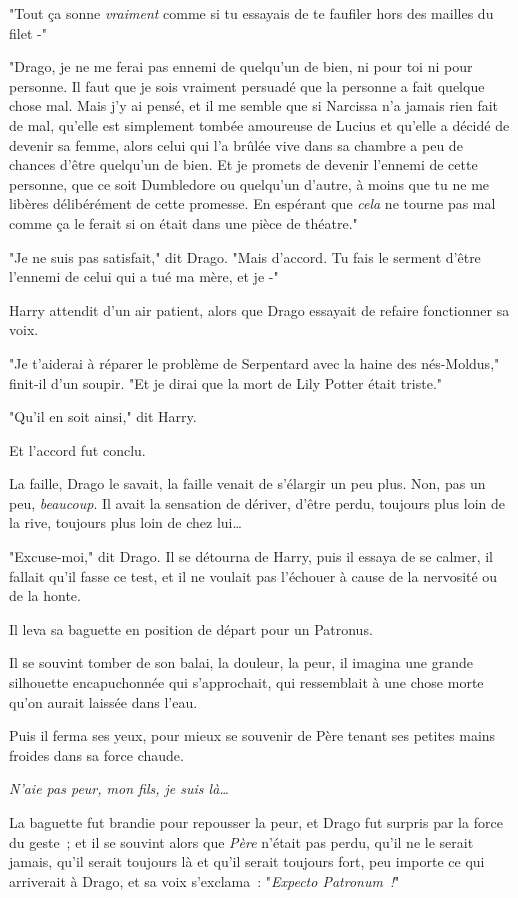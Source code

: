 "Tout ça sonne \emph{vraiment} comme si tu essayais de te faufiler hors des mailles du filet -"

"Drago, je ne me ferai pas ennemi de quelqu'un de bien, ni pour toi ni pour personne. Il faut que je sois vraiment persuadé que la personne a fait quelque chose mal. Mais j'y ai pensé, et il me semble que si Narcissa n'a jamais rien fait de mal, qu'elle est simplement tombée amoureuse de Lucius et qu'elle a décidé de devenir sa femme, alors celui qui l'a brûlée vive dans sa chambre a peu de chances d'être quelqu'un de bien. Et je promets de devenir l'ennemi de cette personne, que ce soit Dumbledore ou quelqu'un d'autre, à moins que tu ne me libères délibérément de cette promesse. En espérant que \emph{cela} ne tourne pas mal comme ça le ferait si on était dans une pièce de théatre."

"Je ne suis pas satisfait," dit Drago. "Mais d'accord. Tu fais le serment d'être l'ennemi de celui qui a tué ma mère, et je -"

Harry attendit d'un air patient, alors que Drago essayait de refaire fonctionner sa voix.

"Je t'aiderai à réparer le problème de Serpentard avec la haine des nés-Moldus," finit-il d'un soupir. "Et je dirai que la mort de Lily Potter était triste."

"Qu'il en soit ainsi," dit Harry.

Et l'accord fut conclu.

La faille, Drago le savait, la faille venait de s'élargir un peu plus. Non, pas un peu, \emph{beaucoup}. Il avait la sensation de dériver, d'être perdu, toujours plus loin de la rive, toujours plus loin de chez lui…

"Excuse-moi," dit Drago. Il se détourna de Harry, puis il essaya de se calmer, il fallait qu'il fasse ce test, et il ne voulait pas l'échouer à cause de la nervosité ou de la honte.

Il leva sa baguette en position de départ pour un Patronus.

Il se souvint tomber de son balai, la douleur, la peur, il imagina une grande silhouette encapuchonnée qui s'approchait, qui ressemblait à une chose morte qu'on aurait laissée dans l'eau.

Puis il ferma ses yeux, pour mieux se souvenir de Père tenant ses petites mains froides dans sa force chaude.

\emph{N'aie pas peur, mon fils, je suis là…}

La baguette fut brandie pour repousser la peur, et Drago fut surpris par la force du geste~; et il se souvint alors que \emph{Père} n'était pas perdu, qu'il ne le serait jamais, qu'il serait toujours là et qu'il serait toujours fort, peu importe ce qui arriverait à Drago, et sa voix s'exclama~: "\emph{Expecto Patronum~!}"

